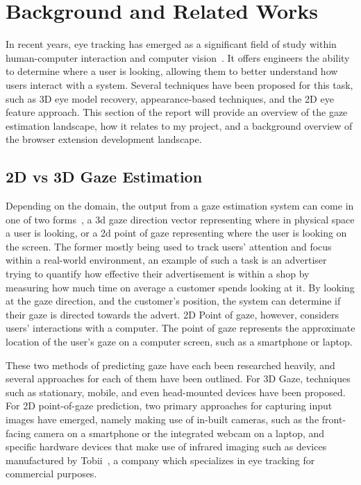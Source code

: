 \documentclass[twocolumn]{report}
\begin{document}
\chapter{Background and Related Works}
\noindent
In recent years, eye tracking has emerged as a significant field of study within human-computer interaction and computer vision~\cite{cheng2021survey,kar2017review}. It offers engineers the ability to determine where a user is looking, allowing them to better understand how users interact with a system. Several techniques have been proposed for this task, such as 3D eye model recovery, appearance-based techniques, and the 2D eye feature approach. This section of the report will provide an overview of the gaze estimation landscape, how it relates to my project, and a background overview of the browser extension development landscape. 

\section{2D vs 3D Gaze Estimation} 

Depending on the domain, the output from a gaze estimation system can come in one of two forms~\cite{liu2022in}, a 3d gaze direction vector representing where in physical space a user is looking, or a 2d point of gaze representing where the user is looking on the screen. The former mostly being used to track users' attention and focus within a real-world environment, an example of such a task is an advertiser trying to quantify how effective their advertisement is within a shop by measuring how much time on average a customer spends looking at it. By looking at the gaze direction, and the customer's position, the system can determine if their gaze is directed towards the advert. 2D Point of gaze, however, considers users' interactions with a computer. The point of gaze represents the approximate location of the user's gaze on a computer screen, such as a smartphone or laptop.

These two methods of predicting gaze have each been researched heavily, and several approaches for each of them have been outlined. For 3D Gaze, techniques such as stationary, mobile, and even head-mounted devices have been proposed. For 2D point-of-gaze prediction, two primary approaches for capturing input images have emerged, namely making use of in-built cameras, such as the front-facing camera on a smartphone or the integrated webcam on a laptop, and specific hardware devices that make use of infrared imaging such as devices manufactured by Tobii~\cite{tobiiprofusion}, a company which specializes in eye tracking for commercial purposes. 
\end{document}
